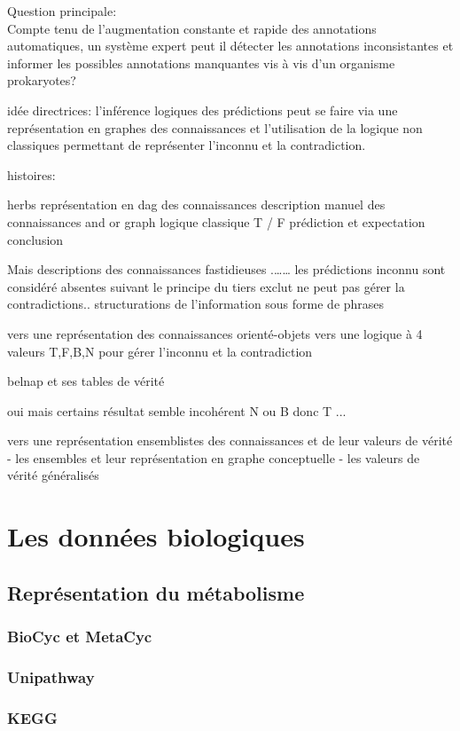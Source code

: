 Question principale:\\
Compte tenu de l'augmentation constante et rapide des annotations automatiques, un système expert peut il détecter les annotations inconsistantes et informer les possibles annotations manquantes vis à vis d'un organisme prokaryotes? 

idée directrices:
l'inférence logiques des prédictions peut se faire via une représentation en graphes des connaissances et l'utilisation de la logique non classiques permettant de représenter l'inconnu et la contradiction.

histoires:

herbs
   représentation en dag des connaissances
   description manuel des connaissances
   and or graph 
   logique classique T / F
   prédiction et expectation
   conclusion
   
Mais descriptions des connaissances fastidieuses .…… 
les prédictions inconnu sont considéré absentes suivant le principe du tiers exclut
ne peut pas gérer la contradictions..
structurations de l'information sous forme de phrases

vers une représentation des connaissances orienté-objets
vers une logique à 4 valeurs T,F,B,N pour gérer l'inconnu et la contradiction

belnap et ses tables de vérité

oui mais certains résultat semble incohérent  N ou B donc T ...

vers une représentation ensemblistes des connaissances et de leur valeurs de vérité
  - les ensembles et leur représentation en graphe conceptuelle
  - les valeurs de vérité généralisés

\chapter{Les données biologiques}
\section{Représentation du métabolisme}
\subsection{BioCyc et MetaCyc}
\subsection{Unipathway}
\subsection{KEGG}
